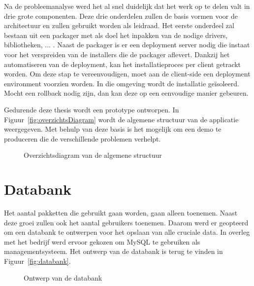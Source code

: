 Na de probleemanalyse werd het al snel duidelijk dat het werk op te delen valt in drie grote componenten.
Deze drie onderdelen zullen de basis vormen voor de architectuur en zullen gebruikt worden als leidraad.
Het eerste onderdeel zal bestaan uit een packager met als doel het inpakken van de nodige drivers, bibliotheken, ... .
Naast de packager is er een deployment server nodig die instaat voor het verspreiden van de installers die de packager aflevert.
Dankzij het automatiseren van de deployment, kan het installatieproces per client getrackt worden. %
Om deze stap te vereenvoudigen, moet aan de client-side een deployment environment voorzien worden.
In die omgeving wordt de installatie geïsoleerd.
Mocht een rollback nodig zijn, dan kan deze op een eenvoudige manier gebeuren.

Gedurende deze thesis wordt een prototype ontworpen.
In Figuur~\vref{fig:overzichtsDiagram} wordt de algemene structuur van de applicatie weergegeven.
Met behulp van deze basis is het mogelijk om een demo te produceren die de verschillende problemen verhelpt.

\begin{figure}[!hbt]
\centering
  
  \caption{Overzichtsdiagram van de algemene structuur}
  \label{fig:overzichtsDiagram}
\end{figure}

\section{Databank}\label{sec:databank}
Het aantal pakketten die gebruikt gaan worden, gaan alleen toenemen.
Naast deze groei zullen ook het aantal gebruikers toenemen.
Daarom werd er geopteerd om een databank te ontwerpen voor het opslaan van alle cruciale data.
In overleg met het bedrijf werd ervoor gekozen om MySQL te gebruiken als managementsysteem.
Het ontwerp van de databank is terug te vinden in Figuur~\vref{fig:databank}.

\begin{figure}[!ht]
\centering
{}
\caption{Ontwerp van de databank}
\label{fig:databank}
\end{figure}

